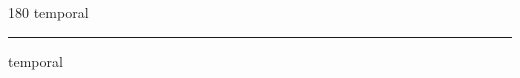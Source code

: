 
\begin{frame}
\begin{center}
\begin{turn}{180}
{\fontsize{2.5cm}{1em}\selectfont temporal}
\end{turn}
\vspace{1em}\par  
\hrule
\vspace{1em}\par  
{\fontsize{2.5cm}{1em}\selectfont temporal}
\end{center}
\end{frame}
